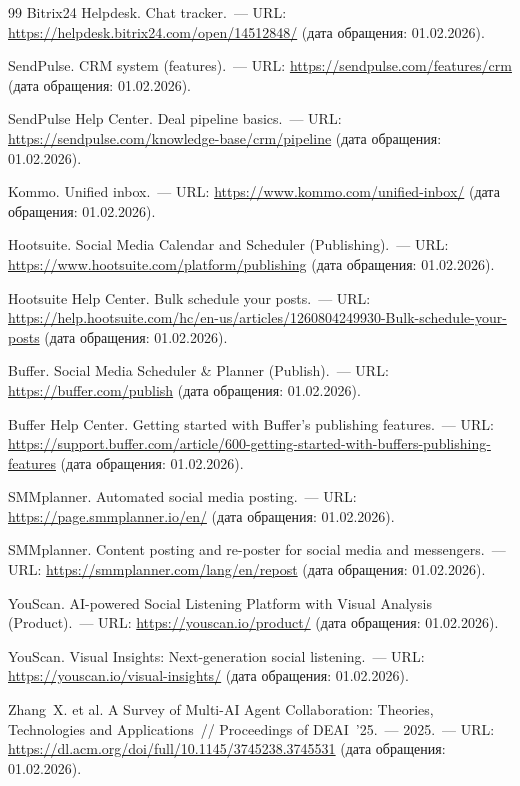 \begin{thebibliography}{99}
Bitrix24 Helpdesk. Chat tracker.~--- URL: \url{https://helpdesk.bitrix24.com/open/14512848/} (дата обращения: 01.02.2026).

SendPulse. CRM system (features).~--- URL: \url{https://sendpulse.com/features/crm} (дата обращения: 01.02.2026).

SendPulse Help Center. Deal pipeline basics.~--- URL: \url{https://sendpulse.com/knowledge-base/crm/pipeline} (дата обращения: 01.02.2026).

Kommo. Unified inbox.~--- URL: \url{https://www.kommo.com/unified-inbox/} (дата обращения: 01.02.2026).

Hootsuite. Social Media Calendar and Scheduler (Publishing).~--- URL: \url{https://www.hootsuite.com/platform/publishing} (дата обращения: 01.02.2026).

Hootsuite Help Center. Bulk schedule your posts.~--- URL: \url{https://help.hootsuite.com/hc/en-us/articles/1260804249930-Bulk-schedule-your-posts} (дата обращения: 01.02.2026).

Buffer. Social Media Scheduler \& Planner (Publish).~--- URL: \url{https://buffer.com/publish} (дата обращения: 01.02.2026).

Buffer Help Center. Getting started with Buffer's publishing features.~--- URL: \url{https://support.buffer.com/article/600-getting-started-with-buffers-publishing-features} (дата обращения: 01.02.2026).

SMMplanner. Automated social media posting.~--- URL: \url{https://page.smmplanner.io/en/} (дата обращения: 01.02.2026).

SMMplanner. Content posting and re-poster for social media and messengers.~--- URL: \url{https://smmplanner.com/lang/en/repost} (дата обращения: 01.02.2026).

YouScan. AI-powered Social Listening Platform with Visual Analysis (Product).~--- URL: \url{https://youscan.io/product/} (дата обращения: 01.02.2026).

YouScan. Visual Insights: Next-generation social listening.~--- URL: \url{https://youscan.io/visual-insights/} (дата обращения: 01.02.2026).

Zhang~X. et al. A Survey of Multi-AI Agent Collaboration: Theories, Technologies and Applications~// Proceedings of DEAI~'25.~--- 2025.~--- URL: \url{https://dl.acm.org/doi/full/10.1145/3745238.3745531} (дата обращения: 01.02.2026).


\end{thebibliography}
